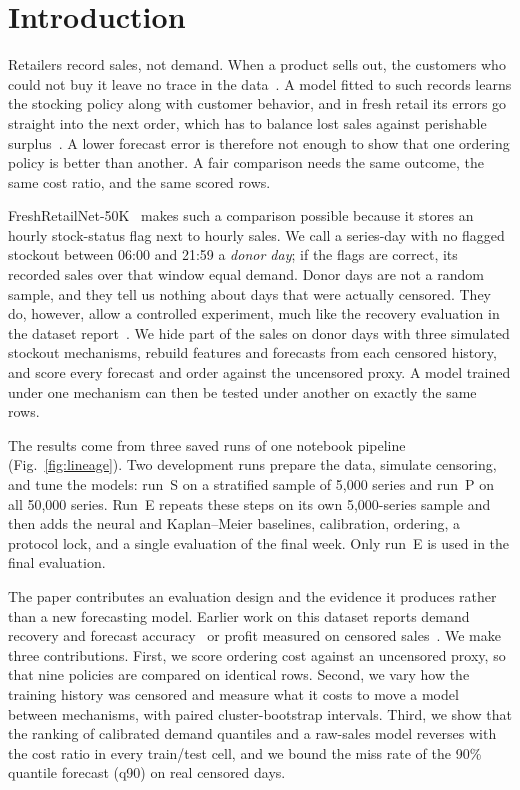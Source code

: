 \section{Introduction}
\label{sec:introduction}

Retailers record sales, not demand. When a product sells out, the customers who could not buy it leave no trace in the data~\cite{fildes2022retail}. A model fitted to such records learns the stocking policy along with customer behavior, and in fresh retail its errors go straight into the next order, which has to balance lost sales against perishable surplus~\cite{nahmias1994demand,huh2011adaptive}. A lower forecast error is therefore not enough to show that one ordering policy is better than another. A fair comparison needs the same outcome, the same cost ratio, and the same scored rows.

FreshRetailNet-50K~\cite{wang2025freshretailnet,dingdong2025datasetcard} makes such a comparison possible because it stores an hourly stock-status flag next to hourly sales. We call a series-day with no flagged stockout between 06:00 and 21:59 a \emph{donor day}; if the flags are correct, its recorded sales over that window equal demand. Donor days are not a random sample, and they tell us nothing about days that were actually censored. They do, however, allow a controlled experiment, much like the recovery evaluation in the dataset report~\cite{wang2025freshretailnet}. We hide part of the sales on donor days with three simulated stockout mechanisms, rebuild features and forecasts from each censored history, and score every forecast and order against the uncensored proxy. A model trained under one mechanism can then be tested under another on exactly the same rows.

The results come from three saved runs of one notebook pipeline (Fig.~\ref{fig:lineage}). Two development runs prepare the data, simulate censoring, and tune the models: run~S on a stratified sample of 5,000 series and run~P on all 50,000 series. Run~E repeats these steps on its own 5,000-series sample and then adds the neural and Kaplan--Meier baselines, calibration, ordering, a protocol lock, and a single evaluation of the final week. Only run~E is used in the final evaluation.

The paper contributes an evaluation design and the evidence it produces rather than a new forecasting model. Earlier work on this dataset reports demand recovery and forecast accuracy~\cite{wang2025freshretailnet} or profit measured on censored sales~\cite{azar2026pipeline}. We make three contributions. First, we score ordering cost against an uncensored proxy, so that nine policies are compared on identical rows. Second, we vary how the training history was censored and measure what it costs to move a model between mechanisms, with paired cluster-bootstrap intervals. Third, we show that the ranking of calibrated demand quantiles and a raw-sales model reverses with the cost ratio in every train/test cell, and we bound the miss rate of the 90\% quantile forecast (q90) on real censored days.

